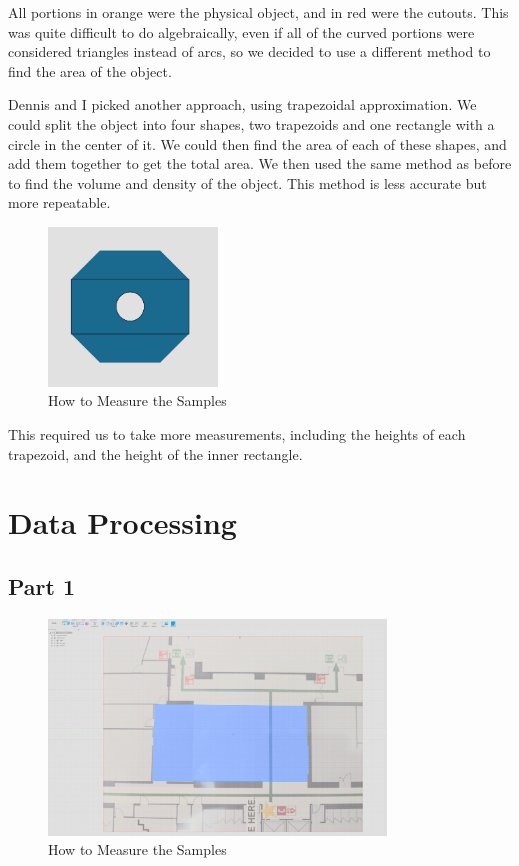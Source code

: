 \documentclass{article}
\begin{document}
All portions in orange were the physical object, and in red were the cutouts. This was quite difficult to do algebraically, even if all of the curved portions were considered triangles instead of arcs, so we decided to use a different method to find the area of the object.

Dennis and I picked another approach, using trapezoidal approximation. We could split the object into four shapes, two trapezoids and one rectangle with a circle in the center of it. We could then find the area of each of these shapes, and add them together to get the total area. We then used the same method as before to find the volume and density of the object. This method is less accurate but more repeatable.

\begin{figure}[htbp]
  \centering
  \includegraphics[width=0.4\textwidth]{Crosssection2.png}
  \caption{How to Measure the Samples}
  \end{figure} \FloatBarrier

This required us to take more measurements, including the heights of each trapezoid, and the height of the inner rectangle.

\section{Data Processing}

\subsection{Part 1}

\begin{figure}[htbp]
  \centering
  \includegraphics[width=0.8\textwidth]{CADFloorPlan.png}
  \caption{How to Measure the Samples}
  \end{figure} \FloatBarrier
\end{document}
